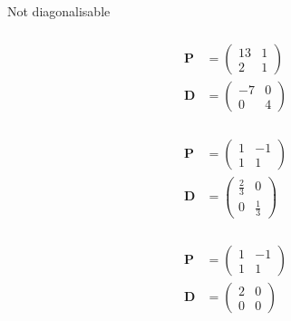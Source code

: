 \documentclass{article}
\begin{document}
\setcounter{subsubsection}{2}
\subsubsection{}

Not diagonalisable

\setcounter{subsubsection}{4}
\subsubsection{}

\begin{align*}
  \mathbf{P} & = \begin{pmatrix}
                   13 & 1 \\
                   2  & 1
                 \end{pmatrix} \\
  \mathbf{D} & = \begin{pmatrix}
                   -7 & 0 \\
                   0  & 4
                 \end{pmatrix}
\end{align*}

\setcounter{subsubsection}{6}
\subsubsection{}

\begin{align*}
  \mathbf{P} & = \begin{pmatrix}
                   1 & -1 \\
                   1 & 1
                 \end{pmatrix}            \\
  \mathbf{D} & = \begin{pmatrix}
                   \frac{2}{3} & 0           \\
                   0           & \frac{1}{3}
                 \end{pmatrix}
\end{align*}

\setcounter{subsubsection}{20}
\subsubsection{}

\begin{align*}
  \mathbf{P} & = \begin{pmatrix}
                   1 & -1 \\
                   1 & 1
                 \end{pmatrix} \\
  \mathbf{D} & = \begin{pmatrix}
                   2 & 0 \\
                   0 & 0
                 \end{pmatrix}
\end{align*}
\end{document}
